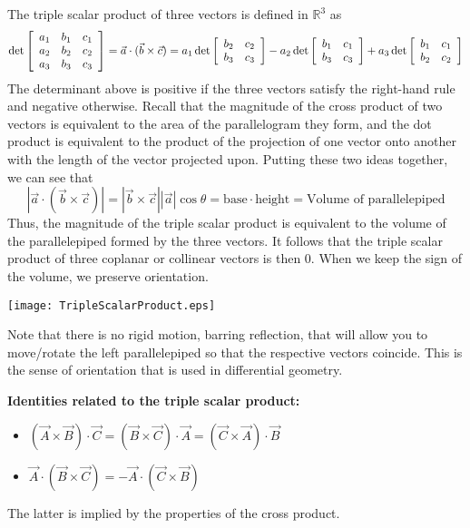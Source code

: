 \documentclass[12pt]{article}
\begin{document}

The triple scalar product of three vectors is defined in $\mathbb{R}^3$ as
$$\det\left[\begin{array}{ccc}a_1&b_1&c_1\\a_2&b_2&c_2\\a_3&b_3&c_3\end{array}\right]=\vec{a}\cdot(\vec{b}\times\vec{c})\\=a_1\det\left[\begin{array}{cc}b_2 & c_2\\ b_3 & c_3\end{array}\right] - a_2\det\left[\begin{array}{cc}b_1 & c_1\\ b_3 & c_3\end{array}\right] + a_3\det\left[\begin{array}{cc}b_1 & c_1\\ b_2 & c_2\end{array}\right]$$
The determinant above is positive if the three vectors satisfy the right-hand rule and negative otherwise. Recall that the magnitude of the cross product of two vectors is equivalent to the area of the parallelogram they form, and the dot product is equivalent to the product of the projection of one vector onto another with the length of the vector projected upon. Putting these two ideas together, we can see that 
$$|\vec{a}\cdot(\vec{b}\times\vec{c})|=|\vec{b}\times\vec{c}||\vec{a}|\cos\theta=\text{base}\cdot\text{height}=\text{Volume of parallelepiped}$$
Thus, the magnitude of the triple scalar product is equivalent to the volume of the parallelepiped formed by the three vectors. It follows that the triple scalar product of three coplanar or collinear vectors is then 0. When we keep the sign of the volume, we preserve orientation.
\begin{center}
\texttt{[image: TripleScalarProduct.eps]}\\
\end{center}
Note that there is no rigid motion, barring reflection, that will allow you to move/rotate the left parallelepiped so that the respective vectors coincide. This is the sense of orientation that is used in differential geometry.

\textbf{Identities related to the triple scalar product:}\\

\begin{itemize}
\item $(\vec{A}\times\vec{B})\cdot\vec{C}=(\vec{B}\times\vec{C})\cdot\vec{A}=(\vec{C}\times\vec{A})\cdot\vec{B}$\\
\item $\vec{A}\cdot(\vec{B}\times\vec{C})=-\vec{A}\cdot(\vec{C}\times\vec{B})$\\
\end{itemize}
The latter is implied by the properties of the cross product.
\end{document}
